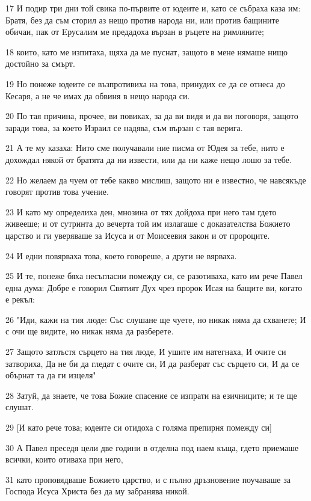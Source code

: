 \par 17 И подир три дни той свика по-първите от юдеите и, като се събраха каза им: Братя, без да съм сторил аз нещо против народа ни, или против бащините обичаи, пак от Eрусалим ме предадоха вързан в ръцете на римляните;
\par 18 които, като ме изпитаха, щяха да ме пуснат, защото в мене нямаше нищо достойно за смърт.
\par 19 Но понеже юдеите се възпротивиха на това, принудих се да се отнеса до Кесаря, а не че имах да обвиня в нещо народа си.
\par 20 По тая причина, прочее, ви повиках, за да ви видя и да ви поговоря, защото заради това, за което Израил се надява, съм вързан с тая верига.
\par 21 А те му казаха: Нито сме получавали ние писма от Юдея за тебе, нито е дохождал някой от братята да ни извести, или да ни каже нещо лошо за тебе.
\par 22 Но желаем да чуем от тебе какво мислиш, защото ни е известно, че навсякъде говорят против това учение.
\par 23 И като му определиха ден, мнозина от тях дойдоха при него там гдето живееше; и от сутринта до вечерта той им излагаше с доказателства Божието царство и ги уверяваше за Исуса и от Моисеевия закон и от пророците.
\par 24 И едни повярваха това, което говореше, а други не вярваха.
\par 25 И те, понеже бяха несъгласни помежду си, се разотиваха, като им рече Павел една дума: Добре е говорил Святият Дух чрез пророк Исая на бащите ви, когато е рекъл:
\par 26 "Иди, кажи на тия люде: Със слушане ще чуете, но никак няма да схванете; И с очи ще видите, но никак няма да разберете.
\par 27 Защото затлъстя сърцето на тия люде, И ушите им натегнаха, И очите си затвориха, Да не би да гледат с очите си, И да разберат със сърцето си, И да се обърнат та да ги изцеля"
\par 28 Затуй, да знаете, че това Божие спасение се изпрати на езичниците; и те ще слушат.
\par 29 [И като рече това; юдеите си отидоха с голяма препирня помежду си]
\par 30 А Павел преседя цели две години в отделна под наем къща, гдето приемаше всички, които отиваха при него,
\par 31 като проповядваше Божието царство, и с пълно дръзновение поучаваше за Господа Исуса Христа без да му забранява никой.

